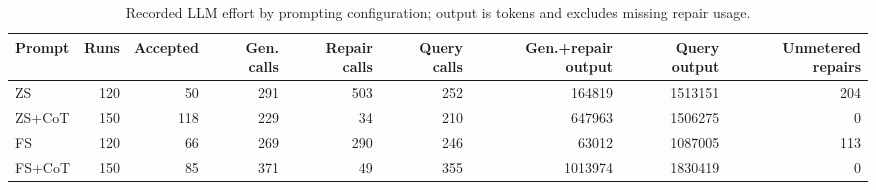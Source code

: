 \begin{table}
\caption{Recorded LLM effort by prompting configuration; output is tokens and excludes missing repair usage.}
\label{tab:effort}
\begin{tabular}{lrrrrrrrr}
\toprule
Prompt & Runs & Accepted & Gen. calls & Repair calls & Query calls & Gen.+repair output & Query output & Unmetered repairs \\
\midrule
ZS & 120 & 50 & 291 & 503 & 252 & 164819 & 1513151 & 204 \\
ZS+CoT & 150 & 118 & 229 & 34 & 210 & 647963 & 1506275 & 0 \\
FS & 120 & 66 & 269 & 290 & 246 & 63012 & 1087005 & 113 \\
FS+CoT & 150 & 85 & 371 & 49 & 355 & 1013974 & 1830419 & 0 \\
\bottomrule
\end{tabular}
\end{table}
